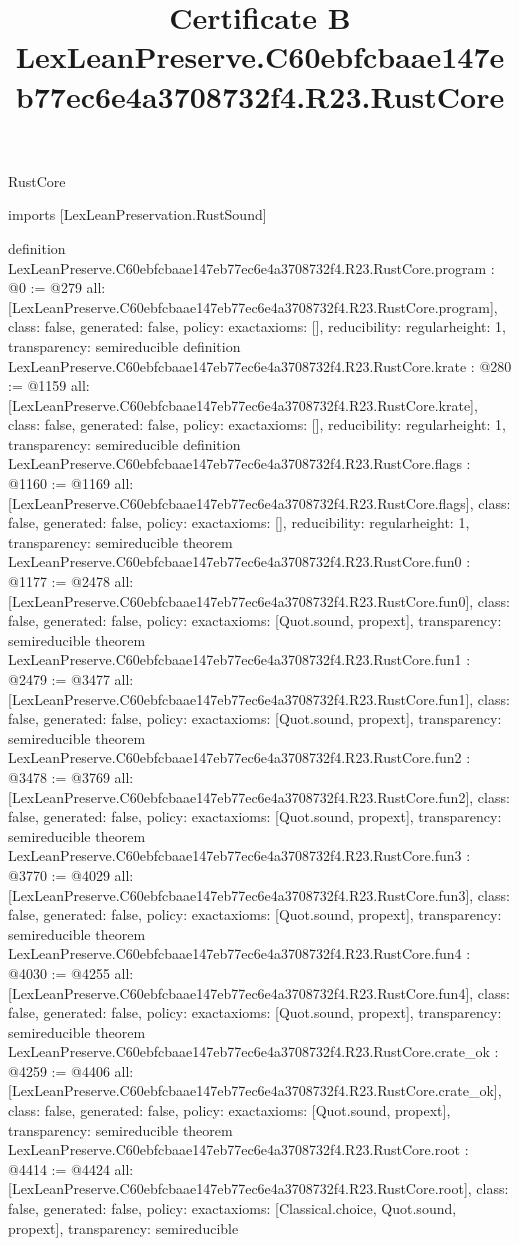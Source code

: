 \begin{lexlean}{RustCore}
\title{Certificate B LexLeanPreserve.C60ebfcbaae147eb77ec6e4a3708732f4.R23.RustCore}
\begin{coremodule}
imports [LexLeanPreservation.RustSound]

definition LexLeanPreserve.C60ebfcbaae147eb77ec6e4a3708732f4.R23.RustCore.program : @0 := @279 {
  all: [LexLeanPreserve.C60ebfcbaae147eb77ec6e4a3708732f4.R23.RustCore.program],
  class: false,
  generated: false,
  policy: exact{axioms: []},
  reducibility: regular{height: 1},
  transparency: semireducible
}
definition LexLeanPreserve.C60ebfcbaae147eb77ec6e4a3708732f4.R23.RustCore.krate : @280 := @1159 {
  all: [LexLeanPreserve.C60ebfcbaae147eb77ec6e4a3708732f4.R23.RustCore.krate],
  class: false,
  generated: false,
  policy: exact{axioms: []},
  reducibility: regular{height: 1},
  transparency: semireducible
}
definition LexLeanPreserve.C60ebfcbaae147eb77ec6e4a3708732f4.R23.RustCore.flags : @1160 := @1169 {
  all: [LexLeanPreserve.C60ebfcbaae147eb77ec6e4a3708732f4.R23.RustCore.flags],
  class: false,
  generated: false,
  policy: exact{axioms: []},
  reducibility: regular{height: 1},
  transparency: semireducible
}
theorem LexLeanPreserve.C60ebfcbaae147eb77ec6e4a3708732f4.R23.RustCore.fun0 : @1177 := @2478 {
  all: [LexLeanPreserve.C60ebfcbaae147eb77ec6e4a3708732f4.R23.RustCore.fun0],
  class: false,
  generated: false,
  policy: exact{axioms: [Quot.sound, propext]},
  transparency: semireducible
}
theorem LexLeanPreserve.C60ebfcbaae147eb77ec6e4a3708732f4.R23.RustCore.fun1 : @2479 := @3477 {
  all: [LexLeanPreserve.C60ebfcbaae147eb77ec6e4a3708732f4.R23.RustCore.fun1],
  class: false,
  generated: false,
  policy: exact{axioms: [Quot.sound, propext]},
  transparency: semireducible
}
theorem LexLeanPreserve.C60ebfcbaae147eb77ec6e4a3708732f4.R23.RustCore.fun2 : @3478 := @3769 {
  all: [LexLeanPreserve.C60ebfcbaae147eb77ec6e4a3708732f4.R23.RustCore.fun2],
  class: false,
  generated: false,
  policy: exact{axioms: [Quot.sound, propext]},
  transparency: semireducible
}
theorem LexLeanPreserve.C60ebfcbaae147eb77ec6e4a3708732f4.R23.RustCore.fun3 : @3770 := @4029 {
  all: [LexLeanPreserve.C60ebfcbaae147eb77ec6e4a3708732f4.R23.RustCore.fun3],
  class: false,
  generated: false,
  policy: exact{axioms: [Quot.sound, propext]},
  transparency: semireducible
}
theorem LexLeanPreserve.C60ebfcbaae147eb77ec6e4a3708732f4.R23.RustCore.fun4 : @4030 := @4255 {
  all: [LexLeanPreserve.C60ebfcbaae147eb77ec6e4a3708732f4.R23.RustCore.fun4],
  class: false,
  generated: false,
  policy: exact{axioms: [Quot.sound, propext]},
  transparency: semireducible
}
theorem LexLeanPreserve.C60ebfcbaae147eb77ec6e4a3708732f4.R23.RustCore.crate_ok : @4259 := @4406 {
  all: [LexLeanPreserve.C60ebfcbaae147eb77ec6e4a3708732f4.R23.RustCore.crate_ok],
  class: false,
  generated: false,
  policy: exact{axioms: [Quot.sound, propext]},
  transparency: semireducible
}
theorem LexLeanPreserve.C60ebfcbaae147eb77ec6e4a3708732f4.R23.RustCore.root : @4414 := @4424 {
  all: [LexLeanPreserve.C60ebfcbaae147eb77ec6e4a3708732f4.R23.RustCore.root],
  class: false,
  generated: false,
  policy: exact{axioms: [Classical.choice, Quot.sound, propext]},
  transparency: semireducible
}


\end{coremodule}
\end{lexlean}
